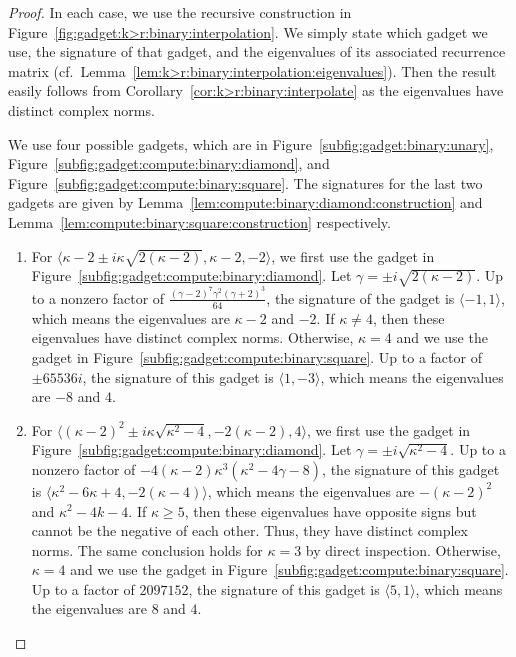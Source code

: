\documentclass[11pt]{article}
\begin{document}
\begin{proof}
 In each case,
 we use the recursive construction in Figure~\ref{fig:gadget:k>r:binary:interpolation}.
 We simply state which gadget we use,
 the signature of that gadget,
 and the eigenvalues of its associated recurrence matrix (cf.~Lemma~\ref{lem:k>r:binary:interpolation:eigenvalues}).
 Then the result easily follows from Corollary~\ref{cor:k>r:binary:interpolate} as the eigenvalues have distinct complex norms.
 
 We use four possible gadgets,
 which are in Figure~\ref{subfig:gadget:binary:unary},
 Figure~\ref{subfig:gadget:compute:binary:diamond},
 and Figure~\ref{subfig:gadget:compute:binary:square}.
 The signatures for the last two gadgets are given by
 Lemma~\ref{lem:compute:binary:diamond:construction} and Lemma~\ref{lem:compute:binary:square:construction} respectively.
 
 \begin{enumerate}
  \item For $\langle \kappa - 2 \pm i \kappa \sqrt{2 (\kappa - 2)}, \kappa - 2, -2 \rangle$,
  we first use the gadget in Figure~\ref{subfig:gadget:compute:binary:diamond}.
  Let $\gamma = \pm i \sqrt{2 (\kappa - 2)}$.
  Up to a nonzero factor of $\frac{(\gamma - 2)^7 \gamma^2 (\gamma + 2)^3}{64}$,
  the signature of the gadget is $\langle -1, 1 \rangle$,
  which means the eigenvalues are $\kappa -2$ and $-2$.
  If $\kappa \ne 4$,
  then these eigenvalues have distinct complex norms.
  Otherwise, $\kappa = 4$ and we use the gadget in Figure~\ref{subfig:gadget:compute:binary:square}.
  Up to a factor of $\pm 65536 i$,
  the signature of this gadget is $\langle 1, -3 \rangle$,
  which means the eigenvalues are $-8$ and $4$.
  
  \item For $\langle (\kappa - 2)^2 \pm i \kappa \sqrt{\kappa^2 - 4}, -2 (\kappa - 2), 4 \rangle$,
  we first use the gadget in Figure~\ref{subfig:gadget:compute:binary:diamond}.
  Let $\gamma = \pm i \sqrt{\kappa^2 - 4}$.
  Up to a nonzero factor of $-4 (\kappa - 2) \kappa^3 (\kappa^2 - 4 \gamma - 8)$,
  the signature of this gadget is $\langle \kappa^2 - 6 \kappa + 4, -2 (\kappa - 4) \rangle$,
  which means the eigenvalues are $-(\kappa - 2)^2$ and $\kappa^2 - 4 k - 4$.
  If $\kappa \ge 5$,
  then these eigenvalues have opposite signs but cannot be the negative of each other.
  Thus, they have distinct complex norms.
  The same conclusion holds for $\kappa = 3$ by direct inspection.
  Otherwise, $\kappa = 4$ and we use the gadget in Figure~\ref{subfig:gadget:compute:binary:square}.
  Up to a factor of $2097152$,
  the signature of this gadget is $\langle 5,1 \rangle$,
  which means the eigenvalues are $8$ and $4$.
  

\end{enumerate}
\end{proof}
\end{document}
